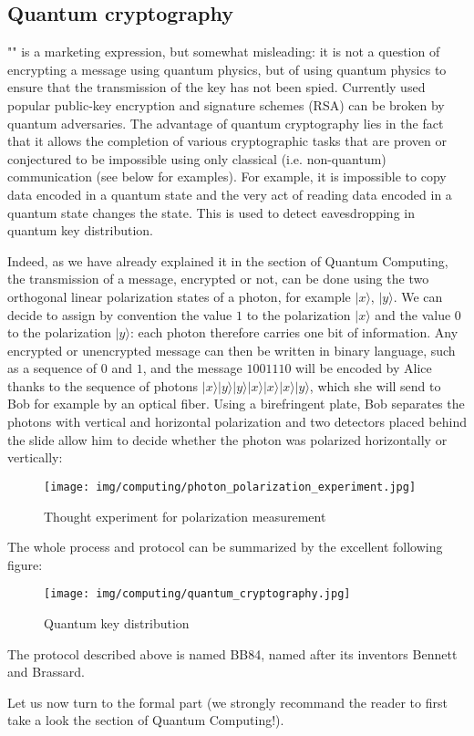 	\pagebreak
	\subsection{Quantum cryptography}\label{quantum cryptography}
	"" is a marketing expression, but somewhat misleading: it is not a question of encrypting a message using quantum physics, but of using quantum physics to ensure that the transmission of the key has not been spied. Currently used popular public-key encryption and signature schemes (RSA) can be broken by quantum adversaries. The advantage of quantum cryptography lies in the fact that it allows the completion of various cryptographic tasks that are proven or conjectured to be impossible using only classical (i.e. non-quantum) communication (see below for examples). For example, it is impossible to copy data encoded in a quantum state and the very act of reading data encoded in a quantum state changes the state. This is used to detect eavesdropping in quantum key distribution.

	Indeed, as we have already explained it in the section of Quantum Computing, the transmission of a message, encrypted or not, can be done using the two orthogonal linear polarization states of a photon, for example $|x\rangle$, $|y\rangle$. We can decide to assign by convention the value $1$ to the polarization $|x\rangle$ and the value $0$ to the polarization $|y\rangle$: each photon therefore carries one bit of information. Any encrypted or unencrypted message can then be written in binary language, such as a sequence of $0$ and $1$, and the message $1001110$ will be encoded by Alice thanks to the sequence of photons $|x\rangle |y\rangle |y\rangle |x\rangle |x\rangle |x\rangle |y\rangle$, which she will send to Bob for example by an optical fiber. Using a birefringent plate, Bob separates the photons with vertical and horizontal polarization and two detectors placed behind the slide allow him to decide whether the photon was polarized horizontally or vertically:
	\begin{figure}[H]
		\centering
		\texttt{[image: img/computing/photon\_polarization\_experiment.jpg]}
		\caption{Thought experiment for polarization measurement}
	\end{figure}
	
	The whole process and protocol can be summarized by the excellent following figure:
	\begin{figure}[H]
		\centering
		\texttt{[image: img/computing/quantum\_cryptography.jpg]}
		\caption{Quantum key distribution}
	\end{figure}
	\begin{tcolorbox}[title=Remark,colframe=black,arc=10pt]
	The protocol described above is named BB84, named after its inventors Bennett and Brassard.
	\end{tcolorbox}
	Let us now turn to the formal part (we strongly recommand the reader to first take a look the section of Quantum Computing!).

